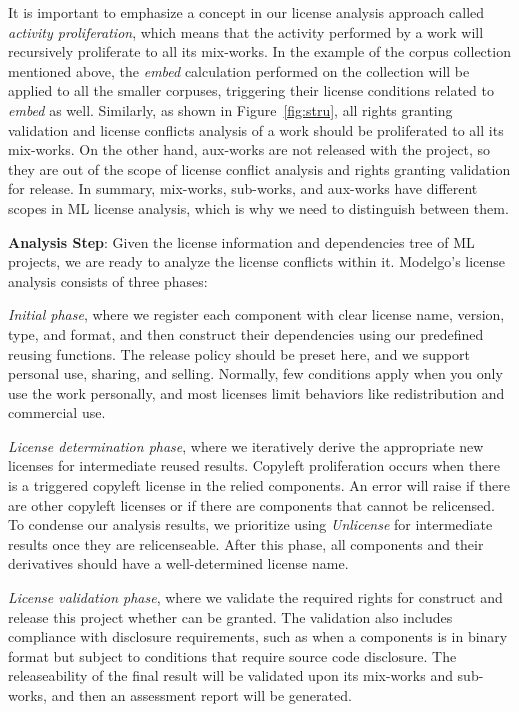 It is important to emphasize a concept in our license analysis approach called \textit{activity proliferation}, which means that the activity performed by a work will recursively proliferate to all its mix-works.
In the example of the corpus collection mentioned above, the \textit{embed} calculation performed on the collection will be applied to all the smaller corpuses, triggering their license conditions related to \textit{embed} as well.
Similarly, as shown in Figure~\ref{fig:stru}, all rights granting validation and license conflicts analysis of a work should be proliferated to all its mix-works.
On the other hand, aux-works are not released with the project, so they are out of the scope of license conflict analysis and rights granting validation for release.
In summary, mix-works, sub-works, and aux-works have different scopes in ML license analysis, which is why we need to distinguish between them.

\textbf{Analysis Step}:
Given the license information and dependencies tree of ML projects, we are ready to analyze the license conflicts within it. 
Modelgo's license analysis consists of three phases:

\textit{Initial phase}, where we register each component with clear license name, version, type, and format, and then construct their dependencies using our predefined reusing functions.
The release policy should be preset here, and we support personal use, sharing, and selling. 
Normally, few conditions apply when you only use the work personally, and most licenses limit behaviors like redistribution and commercial use.

\textit{License determination phase}, where we iteratively derive the appropriate new licenses for intermediate reused results.
Copyleft proliferation occurs when there is a triggered copyleft license in the relied components.
An error will raise if there are other copyleft licenses or if there are components that cannot be relicensed.
To condense our analysis results, we prioritize using \textit{Unlicense} for intermediate results once they are relicenseable.
After this phase, all components and their derivatives should have a well-determined license name.

\textit{License validation phase}, where we validate the required rights for construct and release this project whether can be granted.
The validation also includes compliance with disclosure requirements, such as when a components is in binary format but subject to conditions that require source code disclosure.
The releaseability of the final result will be validated upon its mix-works and sub-works, and then an assessment report will be generated.


